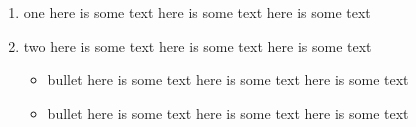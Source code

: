 \begin{enumerate}
	\item one
	      here is some text
	      here is some text
	      here is some text
	\item two
	      here is some text
	      here is some text
	      here is some text
	      \begin{itemize}
	      	\item bullet
	      	      here is some text
	      	      here is some text
	      	      here is some text
	      	\item bullet
	      	      here is some text
	      	      here is some text
	      	      here is some text
	\end{itemize}
\end{enumerate}
